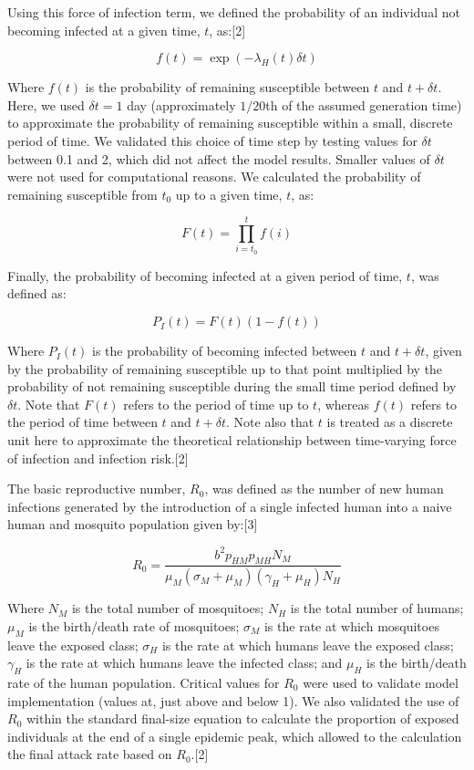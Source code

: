 \documentclass[10pt,letterpaper]{article}
\begin{document}
Using this force of infection term, we defined the probability of an
individual not becoming infected at a given time, \(t\), as:{[}2{]}

\begin{equation}
 f(t) = \exp(-\lambda_H(t) \delta t)
\end{equation}

Where \(f(t)\) is the probability of remaining susceptible between \(t\)
and \(t + \delta t\). Here, we used \(\delta t = 1\) day (approximately
\(1/20\)th of the assumed generation time) to approximate the
probability of remaining susceptible within a small, discrete period of
time. We validated this choice of time step by testing values for
\(\delta t\) between 0.1 and 2, which did not affect the model results.
Smaller values of \(\delta t\) were not used for computational reasons.
We calculated the probability of remaining susceptible from \(t_0\) up
to a given time, \(t\), as:

\begin{equation}
F(t) = \prod_{i=t_0}^t f(i)
\end{equation}

Finally, the probability of becoming infected at a given period of time,
\(t\), was defined as:

\begin{equation}
P_{I}(t) = F(t)(1-f(t))
\end{equation}

Where \(P_I(t)\) is the probability of becoming infected between \(t\)
and \(t + \delta t\), given by the probability of remaining susceptible
up to that point multiplied by the probability of not remaining
susceptible during the small time period defined by \(\delta t\). Note
that \(F(t)\) refers to the period of time up to \(t\), whereas \(f(t)\)
refers to the period of time between \(t\) and \(t + \delta t\). Note
also that \(t\) is treated as a discrete unit here to approximate the
theoretical relationship between time-varying force of infection and
infection risk.{[}2{]}

The basic reproductive number, \(R_0\), was defined as the number of new
human infections generated by the introduction of a single infected
human into a naive human and mosquito population given by:{[}3{]}

\begin{equation}
R_0 = \frac{b^2p_{HM}p_{MH}N_M}{\mu_M(\sigma_M + \mu_M)(\gamma_H + \mu_H)N_H}
\end{equation}

Where \(N_M\) is the total number of mosquitoes; \(N_H\) is the total
number of humans; \(\mu_M\) is the birth/death rate of mosquitoes;
\(\sigma_M\) is the rate at which mosquitoes leave the exposed class;
\(\sigma_H\) is the rate at which humans leave the exposed class;
\(\gamma_H\) is the rate at which humans leave the infected class; and
\(\mu_H\) is the birth/death rate of the human population. Critical
values for \(R_0\) were used to validate model implementation (values
at, just above and below 1). We also validated the use of \(R_0\) within
the standard final-size equation to calculate the proportion of exposed
individuals at the end of a single epidemic peak, which allowed to the
calculation the final attack rate based on \(R_0\).{[}2{]}
\end{document}
